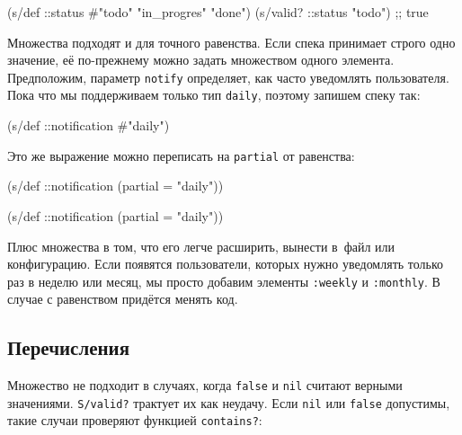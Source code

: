\else

\begin{english}
  \begin{clojure}
(s/def ::status #{"todo" "in_progres" "done"})
(s/valid? ::status "todo") ;; true
  \end{clojure}
\end{english}

\fi

Множества подходят и для точного равенства. Если спека принимает строго одно
значение, её по-прежнему можно задать множеством одного
элемента. Предположим, параметр \verb|notify| определяет, как часто уведомлять
пользователя. Пока что мы поддерживаем только тип \verb|daily|, поэтому
запишем спеку так:

\begin{english}
  \begin{clojure}
(s/def ::notification #{"daily"})
  \end{clojure}
\end{english}

\noindent
Это же выражение можно переписать на \verb|partial| от равенства:

\ifx\DEVICETYPE\MOBILE

\begin{english}
  \begin{clojure}
(s/def ::notification
  (partial = "daily"))
  \end{clojure}
\end{english}

\else

\begin{english}
  \begin{clojure}
(s/def ::notification (partial = "daily"))
  \end{clojure}
\end{english}

\fi

Плюс множества в том, что его легче расширить, вынести в~файл или
конфигурацию. Если появятся пользователи, которых нужно уведомлять только раз в
неделю или месяц, мы просто добавим элементы \verb|:weekly| и \verb|:monthly|. В
случае с равенством придётся менять код.

\subsection{Перечисления}


Множество не подходит в случаях, когда \verb|false| и \verb|nil| считают верными
значениями. \verb|S/valid?| трактует их как неудачу. Если \verb|nil| или
\verb|false| допустимы, такие случаи проверяют функцией \verb|contains?|:

